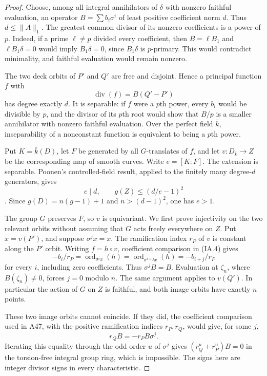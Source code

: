 \begin{proof}
Choose, among all integral annihilators of $\delta$ with nonzero faithful
evaluation, an operator $B=\sum b_i\sigma^i$ of least positive coefficient
norm $d$. Thus $d\le\|A\|_1$. The greatest common divisor of its nonzero
coefficients is a power of $p$. Indeed, if a prime $\ell\ne p$ divided
every coefficient, then $B=\ell B_1$ and $\ell B_1\delta=0$ would imply
$B_1\delta=0$, since $B_1\delta$ is $p$-primary. This would contradict
minimality, and faithful evaluation would remain nonzero.

The two deck orbits of $P'$ and $Q'$ are free and disjoint. Hence a
principal function $f$ with
\[
                  \operatorname{div}(f)=B(Q'-P')
\tag{IA.4}
\]
has degree exactly $d$. It is separable: if $f$ were a $p$th power,
every $b_i$ would be divisible by $p$, and the divisor of its $p$th root
would show that $B/p$ is a smaller annihilator with nonzero faithful
evaluation. Over the perfect field $\bar k$, inseparability of a
nonconstant function is equivalent to being a $p$th power.

Put $K=\bar k(D)$, let $F$ be generated by all $G$-translates of $f$,
and let $v:D_{\bar k}\to Z$ be the corresponding map of smooth curves.
Write $e=[K:F]$. The extension is separable. Poonen's controlled-field
result, applied to the finitely many degree-$d$ generators, gives
\[
                e\mid d,\qquad g(Z)\le(d/e-1)^2
\tag{IA.5}
\]
\cite[Proposition~2.1, Lemma~2.2 and Corollary~2.3]{Poonen2007Gonality}.
Since $g(D)=n(g-1)+1$ and $n>(d-1)^2$, one has $e>1$.

The group $G$ preserves $F$, so $v$ is equivariant. We first prove
injectivity on the two relevant orbits without assuming that $G$ acts
freely everywhere on $Z$. Put $x=v(P')$, and suppose $\sigma^j x=x$.
The ramification index $r_P$ of $v$ is constant along the $P'$ orbit.
Writing $f=h\circ v$, coefficient comparison in (IA.4) gives
\[
 -b_i/r_P=\operatorname{ord}_{\sigma^i x}(h)
        =\operatorname{ord}_{\sigma^{i+j}x}(h)=-b_{i+j}/r_P
\tag{IA.6}
\]
for every $i$, including zero coefficients. Thus $\sigma^jB=B$.
Evaluation at $\zeta_n$, where $B(\zeta_n)\ne0$, forces $j=0$ modulo
$n$. The same argument applies to $v(Q')$. In particular the action of
$G$ on $Z$ is faithful, and both image orbits have exactly $n$ points.

These two image orbits cannot coincide. If they did, the coefficient
comparison used in A47, with the positive ramification indices $r_P,r_Q$,
would give, for some $j$,
\[
                         r_QB=-r_PB\sigma^j.
\tag{IA.7}
\]
Iterating this equality through the odd order $u$ of $\sigma^j$ gives
$(r_Q^u+r_P^u)B=0$ in the torsion-free integral group ring, which is
impossible. The signs here are integer divisor signs in every
characteristic.


\end{proof}
